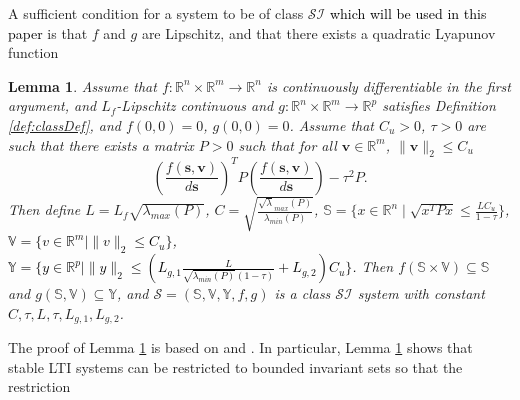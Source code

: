 \documentclass{ifacconf}
\def\vs{{\bm{s}}}
\def\vv{{\bm{v}}}
\newtheorem{lemma}{Lemma}[section]
\newcommand{\class}{\(\mathcal{SI}\)}
\newcommand{\deividas}[1]{\textcolor{black}{ #1}} %
\newcommand{\mref}[1]
{%
	\IfEqCase{#1}{%
		{lemma:full_gen_sys}{A.7}%
		{lemma:stationary_x_v}{A.4}%
		{lemma:classExamples}{A.6}%
		{lemma:series}{A.8}%
		{lemma:Cross-EntropyLipschitz}{A.10}%
		{eq:numexGen}{213}%
		{sec:exampleAppendix}{B}%
		{sec:proofsResults}{A.5}
	}[\ref{#1}]%
}
\begin{document}

A sufficient condition for a system to be of class \class{}  \textcolor{black}{which will be used in this paper} is that $f$ and $g$ are Lipschitz, and that there exists a quadratic Lyapunov function 
\begin{lemma}
\label{lemma:P:classS}
   Assume that $f:\mathbb{R}^{n} \times \mathbb{R}^{m} \to \mathbb{R}^{n}$  is continuously differentiable in the first argument, and $L_f$-Lipschitz continuous and $g:\mathbb{R}^{n} \times \mathbb{R}^{m} \to \mathbb{R}^{p}$ satisfies Definition \ref{def:classDef}, and
   $f(0,0)=0$, $g(0,0)=0$.
   Assume that $C_u >0$, $\tau > 0$ are such that there exists a matrix $P > 0$ such that for all $\vv \in \mathbb{R}^{m}$, $\|\vv\|_{2} \le C_u$
     \begin{equation}
      \label{P:classS}
     (\dfrac{f(\vs,\vv)}{d\vs})^TP(\dfrac{f(\vs,\vv)}{d\vs})- \tau^2 P.
     \end{equation}
   Then define $L=L_{f}\sqrt{\lambda_{max}(P)}$,
   $C=\sqrt{\frac{\sqrt{\lambda}_{max}(P)}{\lambda_{min}(P)}}$,
   $\mathbb{S}=\{x \in \mathbb{R}^{n} \mid \sqrt{x^TPx} \le \frac{LC_u}{1-\tau}\}$,
   \textcolor{black}{
   $\mathbb{V}=\{v \in \mathbb{R}^{m} \mid \|v\|_{2} \le C_u\}$,
   $\mathbb{Y}=\{y \in \mathbb{R}^{p} \mid \|y\|_{2} \le (L_{g,1}\frac{L}{\sqrt{\lambda_{min}(P)}(1-\tau)}+L_{g,2})C_u\}$.}
   Then $f(\mathbb{S}\times \mathbb{V}) \subseteq \mathbb{S}$ and $g(\mathbb{S},\mathbb{V}) \subseteq \mathbb{Y}$, and
   $\mathcal{S}=(\mathbb{S},\mathbb{V},\mathbb{Y},f,g)$ is a class \class{}
   system with constant $C,\tau,L,\tau,L_{g,1},L_{g,2}$. 
\end{lemma}
The proof of Lemma \ref{lemma:P:classS} %
 is  based on \cite[Theorem 13]{TanTAC}
and \cite[Theorem 8]{TranCDC}.
In particular, Lemma \ref{lemma:P:classS} shows that stable LTI systems can be restricted to bounded invariant sets so that the restriction
\end{document}
